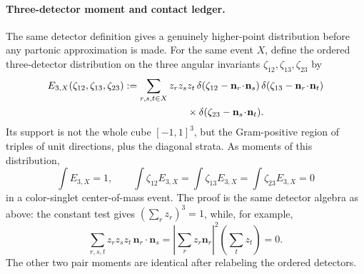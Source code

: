 \paragraph{Three-detector moment and contact ledger.}
The same detector definition gives a genuinely higher-point distribution
before any partonic approximation is made.  For the same event \(X\), define
the ordered three-detector distribution on the three angular invariants
\(\zeta_{12},\zeta_{13},\zeta_{23}\) by
\begin{equation}
\begin{aligned}
  E_{3,X}(\zeta_{12},\zeta_{13},\zeta_{23})
  &:=
  \sum_{r,s,t\in X}
  z_rz_sz_t\,
  \delta(\zeta_{12}-\mathbf n_r\!\cdot\!\mathbf n_s)\,
  \delta(\zeta_{13}-\mathbf n_r\!\cdot\!\mathbf n_t)          \\
  &\hspace{6.3em}\times
  \delta(\zeta_{23}-\mathbf n_s\!\cdot\!\mathbf n_t).
\end{aligned}
  \label{eq:eventwise-three-detector-distribution}
\end{equation}
Its support is not the whole cube \([-1,1]^3\), but the Gram-positive
region of triples of unit directions, plus the diagonal strata.  As moments
of this distribution,
\begin{equation}
  \int E_{3,X}=1,
  \qquad
  \int \zeta_{12}E_{3,X}
  =
  \int \zeta_{13}E_{3,X}
  =
  \int \zeta_{23}E_{3,X}
  =
  0
  \label{eq:eventwise-three-detector-moments}
\end{equation}
in a color-singlet center-of-mass event.  The proof is the same detector
algebra as above: the constant test gives
\((\sum_r z_r)^3=1\), while, for example,
\[
  \sum_{r,s,t}z_rz_sz_t\,\mathbf n_r\cdot\mathbf n_s
  =
  \left|\sum_r z_r\mathbf n_r\right|^2
  \left(\sum_t z_t\right)
  =
  0 .
\]
The other two pair moments are identical after relabeling the ordered
detectors.

